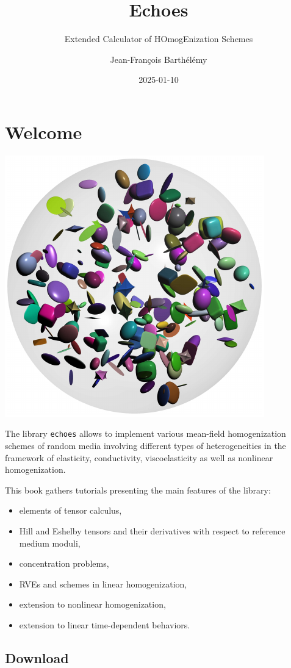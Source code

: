 \documentclass[
  a4paper,
  numbers=noendperiod,
  DIV=12]{scrreprt}
\title{Echoes}
\subtitle{Extended Calculator of HOmogEnization Schemes}
\author{Jean-François Barthélémy}
\date{2025-01-10}
\providecommand{\tightlist}{%
  \setlength{\itemsep}{0pt}\setlength{\parskip}{0pt}}\usepackage{longtable,booktabs,array}
\renewcommand*\contentsname{Table of contents}
\newcommand\contentsname{Table of contents}
\begin{document}
\maketitle

\renewcommand*\contentsname{Table of contents}
{
\hypersetup{linkcolor=}
\setcounter{tocdepth}{2}
\tableofcontents
}


\chapter*{Welcome}\label{sec-welcome}


\begin{center}
\includegraphics[width=0.2\linewidth,height=\textheight,keepaspectratio]{img/cover.pdf}
\end{center}

The library \texttt{echoes} allows to implement various mean-field
homogenization schemes of random media involving different types of
heterogeneities in the framework of elasticity, conductivity,
viscoelasticity as well as nonlinear homogenization.

This book gathers tutorials presenting the main features of the library:

\begin{itemize}
\tightlist
\item
  elements of tensor calculus,
\item
  Hill and Eshelby tensors and their derivatives with respect to
  reference medium moduli,
\item
  concentration problems,
\item
  RVEs and schemes in linear homogenization,
\item
  extension to nonlinear homogenization,
\item
  extension to linear time-dependent behaviors.
\end{itemize}

\section*{Download}\label{download}
\end{document}
